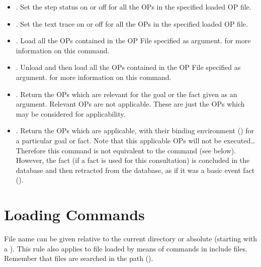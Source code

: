 \begin{itemize}
\item {}. Set the
step status on or off for all the OPs in the specified loaded OP file.

\item {}. Set the text
trace on or off for all the OPs in the specified loaded OP file.

\item {}.  Load all the OPs contained in the
OP File specified as argument.  for more
information on this command.

\item {}.  Unload and then load all the OPs
contained in the OP File specified as argument.  for more information on this command.

\item {}. Return the OPs which are relevant for
the goal or the fact given as an argument. Relevant OPs are not applicable.
These are just the OPs which may be considered for applicability.

\item {}. Return the OPs which are applicable, with
their binding environment () for a
particular goal or fact. Note that this applicable OPs will not be
executed\dots{} Therefore this command is not equivalent to the 
command (see below). However, the fact (if a fact is used for this
consultation) is concluded in the database and then retracted from the
database, as if it was a basic event fact ().

\end{itemize}

\section{\CPK{} Loading Commands}

File name can be given relative to the current directory or absolute
(starting with a \samp{/}). This rule also applies to file loaded by
means of commands in include files. Remember that files are searched in the
 path ().

